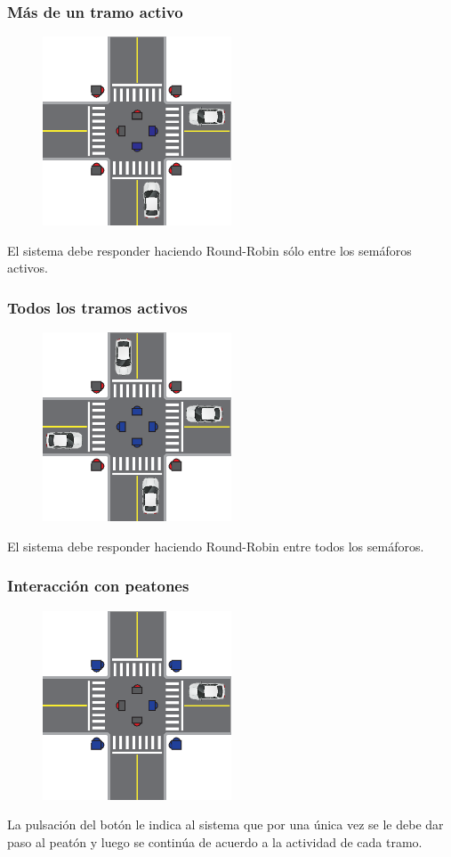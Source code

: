 \begin{frame}
\frametitle{Más de un tramo activo}
\begin{figure}[htbp]
	\centering
	\includegraphics[width=0.50\textwidth]{diagramas/dos-activos.eps}
\end{figure}
El sistema debe responder haciendo Round-Robin sólo entre los semáforos activos.
\end{frame}

\begin{frame}
\frametitle{Todos los tramos activos}
\begin{figure}[htbp]
	\centering
	\includegraphics[width=0.50\textwidth]{diagramas/todos-activos.eps}
\end{figure}
El sistema debe responder haciendo Round-Robin entre todos los semáforos.
\end{frame}

\begin{frame}
\frametitle{Interacción con peatones}
\begin{figure}[htbp]
	\centering
	\includegraphics[width=0.50\textwidth]{diagramas/peaton-auto.eps}
\end{figure}
La pulsación del botón le indica al sistema que por una única vez se le debe dar paso al peatón y luego se continúa de acuerdo a la actividad de cada tramo.
\end{frame}

